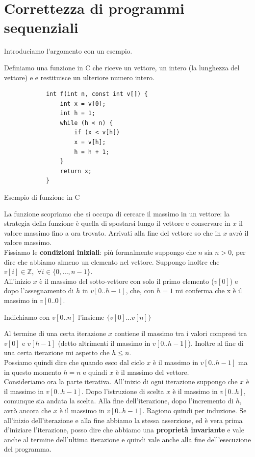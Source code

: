 \chapter{Correttezza di programmi sequenziali}
\label{Capitolo 3}
Introduciamo l'argomento con un esempio.
\begin{esempio}
	Definiamo una funzione in C che riceve un vettore, un intero (la lunghezza del vettore) e
	e restituisce un ulteriore numero intero.
	\begin{listing}[ht]
		\begin{verbatim}
			int f(int n, const int v[]) {
				int x = v[0];
				int h = 1;
				while (h < n) {
					if (x < v[h])
					x = v[h];        
					h = h + 1;
				}
				return x;
			}
		\end{verbatim}
		\caption{Esempio di funzione in C}
		\label{listing:1}
	\end{listing}
	La funzione scopriamo che si occupa di cercare il massimo in
	un vettore: la strategia della funzione è quella di spostarsi lungo il vettore e
	conservare in $x$ il valore massimo fino a ora trovato. Arrivati alla fine
	del vettore so che in $x$ avrò il valore massimo.\\
	Fissiamo le \textbf{condizioni iniziali}: più formalmente suppongo che $n$ sia $n > 0$, per dire che abbiamo almeno un
	elemento nel vettore. Suppongo inoltre che $v[i]\in\mathbb{Z},\,\,\forall i\in
	\{0,\ldots, n-1\}$. \\
	All'inizio $x$ è il massimo del sotto-vettore con solo il primo elemento
	($v[0]$) e dopo l'assegnamento di $h$ in $v[0..h-1]$, che, con $h=1$ mi
	conferma che x è il massimo in $v[0..0]$. \\
	\begin{nota}
	Indichiamo con $v[0..n]$ l'insieme $\{v[0] \dots v[n]\}$ 
	\end{nota}
	Al termine di una certa iterazione $x$ contiene il massimo 
	tra i valori compresi tra $v[0]$ e $v[h-1]$ (detto altrimenti il massimo in
	$v[0..h-1]$). Inoltre al fine di una certa iterazione mi aspetto che $h\leq
	n$.\\
	Possiamo quindi dire che quando esco dal ciclo $x$ è il massimo in $v[0..h-1]$
	ma in questo momento $h=n$ e quindi $x$ è il massimo del vettore.\\
	Consideriamo ora la parte iterativa. All'inizio di ogni iterazione suppongo
	che $x$ è il massimo in $v[0..h-1]$. Dopo l'istruzione di scelta $x$ è il
	massimo in $v[0..h]$, comunque sia andata la scelta. Alla fine
	dell'iterazione, dopo l'incremento di $h$, avrò ancora che $x$ è il massimo in
	$v[0..h-1]$. Ragiono quindi per induzione. Se all'inizio dell'iterazione e
	alla fine abbiamo la stessa asserzione, ed è vera prima d'iniziare l'iterazione,
	posso dire che abbiamo una \textbf{proprietà invariante} e vale anche al termine
	dell'ultima iterazione e quindi vale anche alla fine dell'esecuzione del
	programma. 
\end{esempio}
